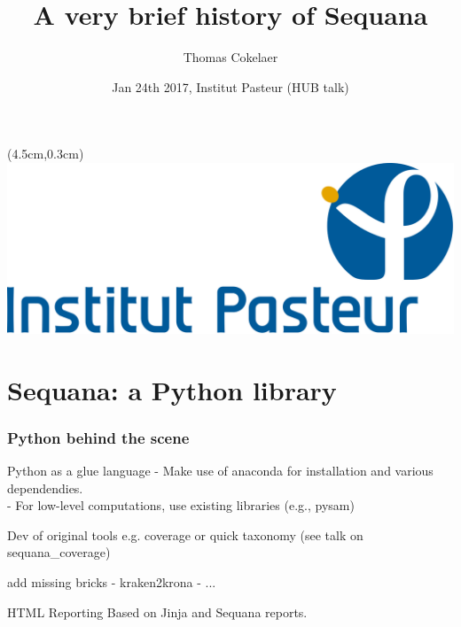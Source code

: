 \documentclass{beamer}
\title[Sequana]{A very brief history of Sequana}
\author[T. Cokelaer]{Thomas Cokelaer}
\institute{Institut Pasteur}
\date{Jan 24th 2017, Institut Pasteur (HUB talk)}
\begin{document}

\begin{frame}[plain]
    \titlepage
    \begin{textblock*}{5cm}(4.5cm,0.3cm)
        \includegraphics[scale=0.09]{images/Institut_Pasteur.png}
    \end{textblock*}
\end{frame}




%





\section{Sequana: a Python library}

\begin{frame}
\frametitle{Python behind the scene}
 \begin{block}{Python as a glue language}
     - Make use of anaconda for installation and various dependendies. \\
     - For low-level computations, use existing libraries (e.g., pysam)
 \end{block}
 
 \begin{block}{Dev of original tools}
  e.g. coverage or quick taxonomy (see talk on sequana\_coverage)
 \end{block}
 
 \begin{block}{add missing bricks}
  - kraken2krona
  - ...
 \end{block}

 \begin{block}{HTML Reporting}
  Based on Jinja and Sequana reports.
 \end{block}
\end{frame}
\end{document}

